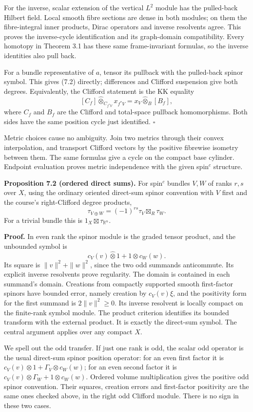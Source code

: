 \documentclass[
  11pt,
]{article}
\begin{document}
For the inverse, scalar extension of the vertical \(L^2\) module has the
pulled-back Hilbert field. Local smooth fibre sections are dense in both
modules; on them the fibre-integral inner products, Dirac operators and
inverse resolvents agree. This proves the inverse-cycle identification
and its graph-domain compatibility. Every homotopy in Theorem 3.1 has
these same frame-invariant formulas, so the inverse identities also pull
back.

For a bundle representative of \(a\), tensor its pullback with the
pulled-back spinor symbol. This gives (7.2) directly; differences and
Clifford suspension give both degrees. Equivalently, the Clifford
statement is the KK equality \[
[C_f]\widehat\otimes_{C_{f^*V}}x_{f^*V}
 =x_V\widehat\otimes_B[B_f],
\tag{7.3}
\] where \(C_f\) and \(B_f\) are the Clifford and total-space pullback
homomorphisms. Both sides have the same position cycle just identified.
\(\square\)

Metric choices cause no ambiguity. Join two metrics through their convex
interpolation, and transport Clifford vectors by the positive fibrewise
isometry between them. The same formulas give a cycle on the compact
base cylinder. Endpoint evaluation proves metric independence with the
given spin\(^{c}\) structure.

\textbf{Proposition 7.2 (ordered direct sums).} For spin\(^{c}\) bundles
\(V,W\) of ranks \(r,s\) over \(X\), using the ordinary oriented
direct-sum spinor convention with \(V\) first and the course's
right-Clifford degree products, \[
\tau_{V\oplus W}=(-1)^{rs}\tau_V\boxtimes_R\tau_W.
\tag{7.4}
\] For a trivial bundle this is \(1_X\boxtimes\tau_{\mathbb R^n}\).

\textbf{Proof.} In even rank the spinor module is the graded tensor
product, and the unbounded symbol is \[
c_V(v)\widehat\otimes1+1\widehat\otimes c_W(w).
\tag{7.5}
\] Its square is \(\|v\|^2+\|w\|^2\), since the two odd summands
anticommute. Its explicit inverse resolvents prove regularity. The
domain is contained in each summand's domain. Creations from compactly
supported smooth first-factor spinors have bounded error, namely
creation by \(c_V(v)\xi\), and the positivity form for the first summand
is \(2\|v\|^2\geq0\). Its inverse resolvent is locally compact on the
finite-rank symbol module. The product criterion identifies its bounded
transform with the external product. It is exactly the direct-sum
symbol. The central argument applies over any compact \(X\).

We spell out the odd transfer. If just one rank is odd, the scalar odd
operator is the usual direct-sum spinor position operator: for an even
first factor it is \(c_V(v)\otimes1+\Gamma_V\otimes c_W(w)\); for an
even second factor it is \(c_V(v)\otimes\Gamma_W+1\otimes c_W(w)\).
Ordered volume multiplication gives the positive odd spinor convention.
Their squares, creation errors and first-factor positivity are the same
ones checked above, in the right odd Clifford module. There is no sign
in these two cases.
\end{document}
